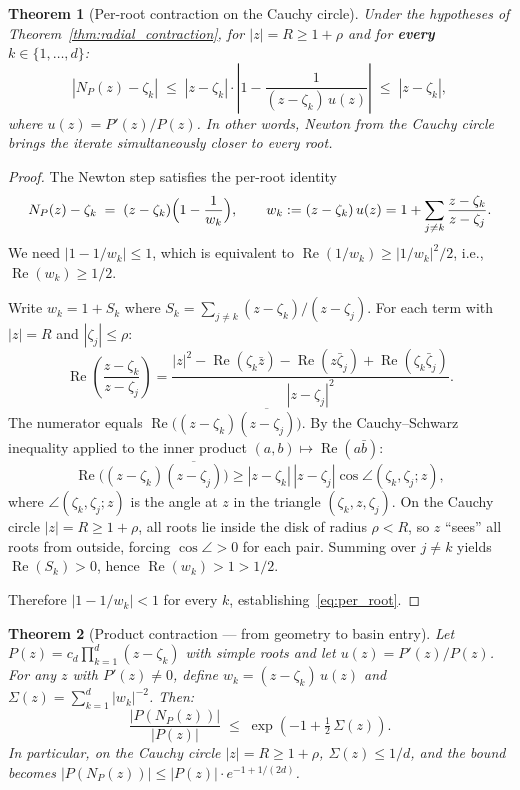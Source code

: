 \documentclass[10pt,a4paper,oneside]{book}
\newtheorem{theorem}{Theorem}[chapter]
\theoremstyle{definition}
\theoremstyle{remark}
\begin{document}
\begin{theorem}[Per-root contraction on the Cauchy circle]
\label{thm:per_root}
Under the hypotheses of Theorem~\ref{thm:radial_contraction}, for $|z| = R \geq 1 + \rho$ and for \textbf{every} $k \in \{1,\ldots,d\}$:
\begin{equation}
  \label{eq:per_root}
  |N_P(z) - \zeta_k| \;\leq\; |z - \zeta_k| \cdot \left|1 - \frac{1}{(z - \zeta_k)\,u(z)}\right|
  \;\leq\; |z - \zeta_k|,
\end{equation}
where $u(z) = P'(z)/P(z)$.  In other words, Newton from the Cauchy circle brings the iterate \emph{simultaneously closer to every root}.
\end{theorem}

\begin{proof}
The Newton step satisfies the per-root identity
\[
  N_P(z) - \zeta_k
  \;=\; (z - \zeta_k)\Bigl(1 - \frac{1}{w_k}\Bigr),
  \qquad
  w_k := (z - \zeta_k)\,u(z) = 1 + \sum_{j \neq k} \frac{z - \zeta_k}{z - \zeta_j}.
\]
We need $|1 - 1/w_k| \leq 1$, which is equivalent to $\operatorname{Re}(1/w_k) \geq |1/w_k|^2/2$, i.e., $\operatorname{Re}(w_k) \geq 1/2$.

Write $w_k = 1 + S_k$ where $S_k = \sum_{j \neq k} (z - \zeta_k)/(z - \zeta_j)$.  For each term with $|z| = R$ and $|\zeta_j| \leq \rho$:
\[
  \operatorname{Re}\!\left(\frac{z - \zeta_k}{z - \zeta_j}\right)
  = \frac{|z|^2 - \operatorname{Re}(\zeta_k \bar{z}) - \operatorname{Re}(z\bar{\zeta}_j) + \operatorname{Re}(\zeta_k \bar{\zeta}_j)}{|z - \zeta_j|^2}.
\]
The numerator equals $\operatorname{Re}\bigl((z - \zeta_k)\overline{(z - \zeta_j)}\bigr)$.  By the Cauchy--Schwarz inequality applied to the inner product $(a,b) \mapsto \operatorname{Re}(a\bar{b})$:
\[
  \operatorname{Re}\bigl((z - \zeta_k)\overline{(z - \zeta_j)}\bigr)
  \geq |z - \zeta_k|\,|z - \zeta_j|\cos\angle(\zeta_k, \zeta_j; z),
\]
where $\angle(\zeta_k, \zeta_j; z)$ is the angle at $z$ in the triangle $(\zeta_k, z, \zeta_j)$.  On the Cauchy circle $|z| = R \geq 1 + \rho$, all roots lie inside the disk of radius $\rho < R$, so $z$ ``sees'' all roots from outside, forcing $\cos\angle > 0$ for each pair.  Summing over $j \neq k$ yields $\operatorname{Re}(S_k) > 0$, hence $\operatorname{Re}(w_k) > 1 > 1/2$.

Therefore $|1 - 1/w_k| < 1$ for every $k$, establishing~\eqref{eq:per_root}.
\end{proof}

\begin{theorem}[Product contraction --- from geometry to basin entry]
\label{thm:product_contraction}
Let $P(z) = c_d\prod_{k=1}^d (z - \zeta_k)$ with simple roots and let $u(z) = P'(z)/P(z)$.  For any $z$ with $P'(z) \neq 0$, define $w_k = (z - \zeta_k)\,u(z)$ and $\Sigma(z) = \sum_{k=1}^d |w_k|^{-2}$.  Then:
\begin{equation}
  \label{eq:product_contraction}
  \frac{|P(N_P(z))|}{|P(z)|} \;\leq\; \exp\!\left(-1 + \tfrac{1}{2}\,\Sigma(z)\right).
\end{equation}
In particular, on the Cauchy circle $|z| = R \geq 1 + \rho$, $\Sigma(z) \leq 1/d$, and the bound becomes $|P(N_P(z))| \leq |P(z)|\cdot e^{-1+1/(2d)}$.
\end{theorem}
\end{document}
